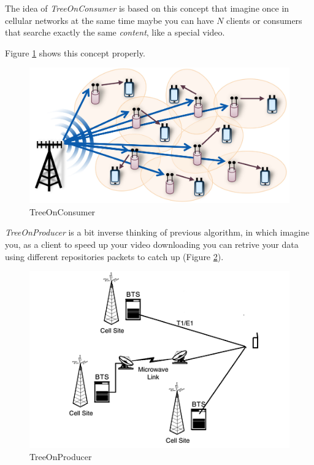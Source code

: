 The idea of \textit{TreeOnConsumer} is based on this concept that imagine once in cellular networks at the same time maybe you can have $N$ clients or consumers that searche exactly the same \textit{content}, like a special video.

Figure \ref{consumer} shows this concept properly.


\begin{figure}[H]

\begin{center}

\includegraphics[scale = 0.1]{Pictures/treeonconsumer.jpg}

\caption{TreeOnConsumer} \label{consumer} 

\end{center}

\end{figure}
     

\textit{TreeOnProducer} is a bit inverse thinking of previous algorithm, in which imagine you, as a client to speed up your video downloading you can retrive your data using different repositories packets to catch up (Figure \ref{producer}).

\begin{figure}[H]

\begin{center}

\includegraphics[scale = 0.4]{Pictures/treeonproducer.png}

\caption{TreeOnProducer} \label{producer} 

\end{center}

\end{figure}


